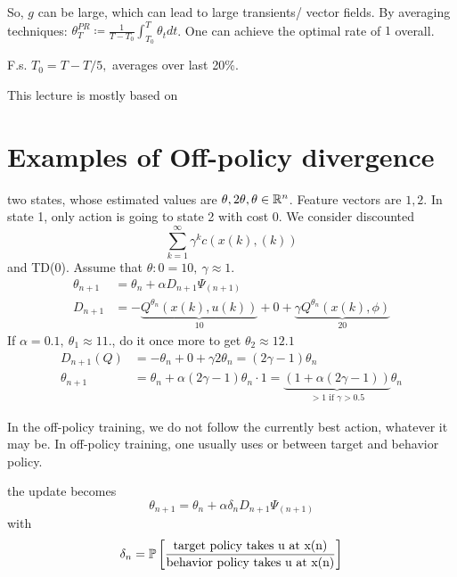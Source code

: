 So, \(g\) can be large, which can lead to large transients/ vector fields. By averaging
techniques: \(\theta_T^{PR}\coloneqq \frac{1}{T-T_0}\int_{T_0}^T \theta_tdt\).
One can achieve the optimal rate of \(1\) overall.

F.s. \(T_0=T-T/5,\) averages over last 20\%.



This lecture is mostly based on \cite{BartoSutton1998}


\section{Examples of Off-policy divergence}


two states, whose estimated values are \(\theta,2\theta,\theta\in \mathbb{R}^n\). Feature vectors 
are \(1,2\). In state 1, only action is going to state 2 with cost 0. We consider discounted 
\[\sum_{k=1}^\infty\gamma^kc(x(k),(k))\]
and TD(0). Assume that \(\theta:0=10,\ \gamma\approx 1\). 
\begin{align*}
    \theta_{n+1}&=\theta_n+\alpha D_{n+1}\Psi_{(n+1)}\\
    D_{n+1}&=-\underbrace{Q^{\theta_n}(x(k),u(k))}_{10}+0+\underbrace{\gamma Q^{\theta_n}(x(k),\phi)}_{20}
\end{align*}
If \(\alpha=0.1,\ \theta_1\approx 11\)., do it once more to get \(\theta_2\approx 12.1\)
\begin{align*}
    D_{n+1}(Q)&=-\theta_n+0+\gamma 2 \theta_n=(2\gamma-1)\theta_n\\
    \theta_{n+1}&=\theta_n+\alpha(2\gamma-1)\theta_n\cdot 1=\underbrace{(1+\alpha(2\gamma-1))}_{>1 \text{ if }\gamma>0.5}\theta_n
\end{align*}

In the off-policy training, we do not follow the currently best action, whatever it may be.
In off-policy training, one usually uses  or 
between target and behavior policy.

the update becomes 
\[\theta_{n+1}=\theta_n+\alpha\delta_n D_{n+1}\Psi_{(n+1)}\]
with \[\delta_n=\mathbb{P}\left[\frac{\text{target policy takes u at x(n)}}{\text{behavior policy takes u at x(n)}}\right]\]

